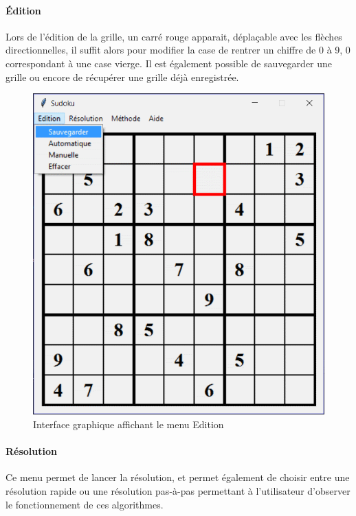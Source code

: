 \documentclass[12pt,a4paper]{report}
\begin{document}
\paragraph{Édition} Lors de l'édition de la grille, un carré rouge apparait, déplaçable avec les flèches directionnelles, il suffit alors pour modifier la case de rentrer un chiffre de 0 à 9, 0 correspondant à une case vierge. Il est également possible de sauvegarder une grille ou encore de récupérer une grille déjà enregistrée.

\begin{figure}[!h]
 \center
 \includegraphics[scale=0.55]{../pictures/Sudoku_edition}
 \caption{Interface graphique affichant le menu Edition}
\end{figure}
\newpage
\paragraph{Résolution}Ce menu permet de lancer la résolution, et permet également de choisir entre une résolution rapide ou une résolution pas-à-pas permettant à l'utilisateur d'observer le fonctionnement de ces algorithmes.
\end{document}
